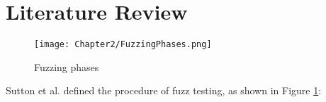 \section{Literature Review}


\begin{figure}[!b]
    \texttt{[image: Chapter2/FuzzingPhases.png]}
    \centering
    \caption{Fuzzing phases}
    \label{fig:fuzz_phases}
\end{figure} 


Sutton et al. \cite{sutton2007fuzzing} defined the procedure of fuzz testing, as shown in Figure \ref{fig:fuzz_phases}:
